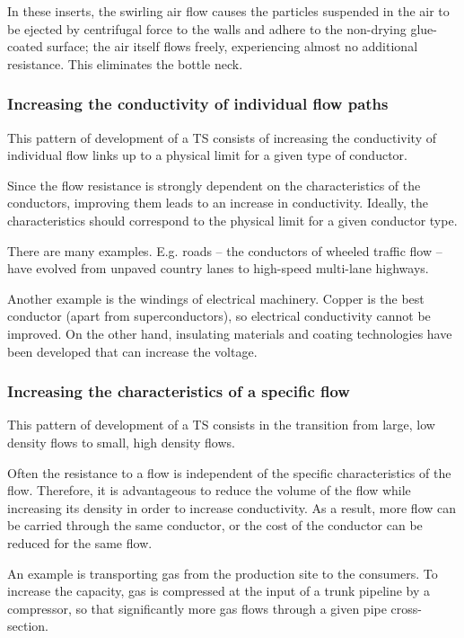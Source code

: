 \documentclass[a4paper,11pt]{article}
\begin{document}
In these inserts, the swirling air flow causes the particles suspended in the
air to be ejected by centrifugal force to the walls and adhere to the
non-drying glue-coated surface; the air itself flows freely, experiencing
almost no additional resistance. This eliminates the bottle neck.

\subsubsection{Increasing the conductivity of individual flow paths}

This pattern of development of a TS consists of increasing the conductivity of
individual flow links up to a physical limit for a given type of conductor.

Since the flow resistance is strongly dependent on the characteristics of the
conductors, improving them leads to an increase in conductivity. Ideally, the
characteristics should correspond to the physical limit for a given conductor
type.

There are many examples. E.g. roads -- the conductors of wheeled traffic flow
-- have evolved from unpaved country lanes to high-speed multi-lane highways.

Another example is the windings of electrical machinery. Copper is the best
conductor (apart from superconductors), so electrical conductivity cannot be
improved. On the other hand, insulating materials and coating technologies
have been developed that can increase the voltage.

\subsubsection{Increasing the characteristics of a specific flow}

This pattern of development of a TS consists in the transition from large, low
density flows to small, high density flows.

Often the resistance to a flow is independent of the specific characteristics
of the flow. Therefore, it is advantageous to reduce the volume of the flow
while increasing its density in order to increase conductivity. As a result,
more flow can be carried through the same conductor, or the cost of the
conductor can be reduced for the same flow.

An example is transporting gas from the production site to the consumers. To
increase the capacity, gas is compressed at the input of a trunk pipeline by a
compressor, so that significantly more gas flows through a given pipe
cross-section.
\end{document}
